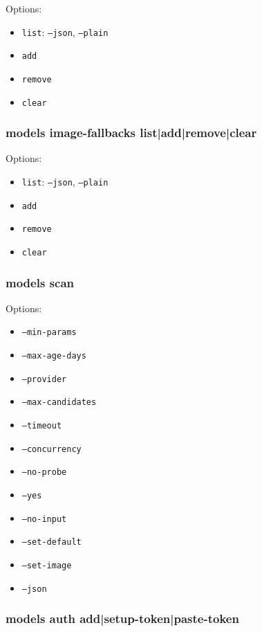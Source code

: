 Options:

\begin{itemize}
  \item \texttt{list}: \texttt{--json}, \texttt{--plain}
  \item \texttt{add }
  \item \texttt{remove }
  \item \texttt{clear}
\end{itemize}


\subsubsection{models image-fallbacks list|add|remove|clear}


Options:

\begin{itemize}
  \item \texttt{list}: \texttt{--json}, \texttt{--plain}
  \item \texttt{add }
  \item \texttt{remove }
  \item \texttt{clear}
\end{itemize}


\subsubsection{models scan}


Options:

\begin{itemize}
  \item \texttt{--min-params }
  \item \texttt{--max-age-days }
  \item \texttt{--provider }
  \item \texttt{--max-candidates }
  \item \texttt{--timeout }
  \item \texttt{--concurrency }
  \item \texttt{--no-probe}
  \item \texttt{--yes}
  \item \texttt{--no-input}
  \item \texttt{--set-default}
  \item \texttt{--set-image}
  \item \texttt{--json}
\end{itemize}


\subsubsection{models auth add|setup-token|paste-token}



